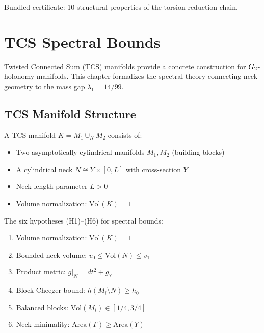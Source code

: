 \begin{theorem}\label{thm:k3_cert}
    \leanok
    Bundled certificate: 10 structural properties of the torsion reduction chain.
\end{theorem}

\chapter{TCS Spectral Bounds}\label{chap:tcs}

Twisted Connected Sum (TCS) manifolds provide a concrete construction for $G_2$-holonomy
manifolds. This chapter formalizes the spectral theory connecting neck geometry to
the mass gap $\lambda_1 = 14/99$.

\section{TCS Manifold Structure}

\begin{definition}\label{def:TCSManifold}
    \leanok
    A TCS manifold $K = M_1 \cup_N M_2$ consists of:
    \begin{itemize}
        \item Two asymptotically cylindrical manifolds $M_1, M_2$ (building blocks)
        \item A cylindrical neck $N \cong Y \times [0, L]$ with cross-section $Y$
        \item Neck length parameter $L > 0$
        \item Volume normalization: $\mathrm{Vol}(K) = 1$
    \end{itemize}
\end{definition}

\begin{definition}\label{def:TCSHypotheses}
    \leanok
    The six hypotheses (H1)--(H6) for spectral bounds:
    \begin{enumerate}
        \item[(H1)] Volume normalization: $\mathrm{Vol}(K) = 1$
        \item[(H2)] Bounded neck volume: $v_0 \leq \mathrm{Vol}(N) \leq v_1$
        \item[(H3)] Product metric: $g|_N = dt^2 + g_Y$
        \item[(H4)] Block Cheeger bound: $h(M_i \setminus N) \geq h_0$
        \item[(H5)] Balanced blocks: $\mathrm{Vol}(M_i) \in [1/4, 3/4]$
        \item[(H6)] Neck minimality: $\mathrm{Area}(\Gamma) \geq \mathrm{Area}(Y)$
    \end{enumerate}
\end{definition}

